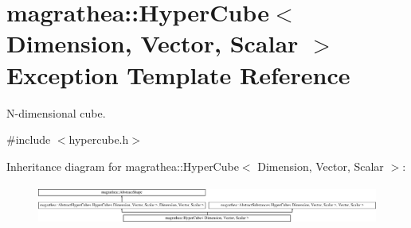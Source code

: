 \hypertarget{exceptionmagrathea_1_1HyperCube}{\section{magrathea\-:\-:Hyper\-Cube$<$ Dimension, Vector, Scalar $>$ Exception Template Reference}
\label{exceptionmagrathea_1_1HyperCube}
}


N-\/dimensional cube.  




{\ttfamily \#include $<$hypercube.\-h$>$}

Inheritance diagram for magrathea\-:\-:Hyper\-Cube$<$ Dimension, Vector, Scalar $>$\-:\begin{figure}[H]
\begin{center}
\leavevmode
\includegraphics[height=1.352657cm]{exceptionmagrathea_1_1HyperCube}
\end{center}
\end{figure}
